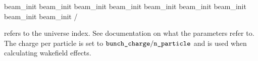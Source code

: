 {{{{{{{{{{{{\begin{example}
    beam_init%
    beam_init%
    beam_init%
    beam_init%
    beam_init%
    beam_init%
    beam_init%
    beam_init%
    beam_init%
  /
\end{example}
 refers to the universe index. See \bmad documentation on what
the  parameters refer to. The charge per particle is set to
$\vn{bunch_charge} / \vn{n_particle}$ and is used when calculating wakefield
effects.

\vn{%
construct the beam's particle distribution. If not set then the emittances set in
the lattice file are used. These emittances are also used as the initial emittance
in a linear lattice for the emittance calculation using the radiation integrals.

}}}}}}}}}}}}}
